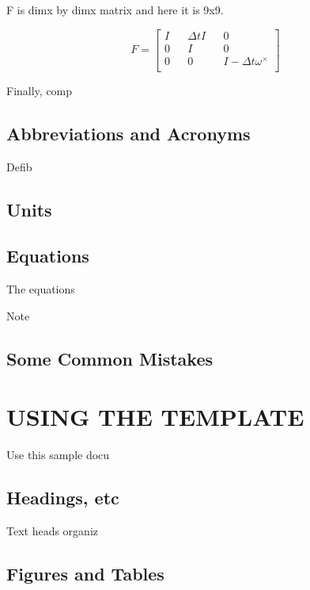 \documentclass[letterpaper, 10 pt, conference]{ieeeconf}  %
\begin{document}
F is dimx by dimx matrix and here it is 9x9.

\begin{equation}
F =
\begin{bmatrix}
        I && \Delta t   I && 0  \\
        0 && I && 0  \\
        0 && 0 && I- \Delta t \omega^{\times}  \\
\end{bmatrix}
\end{equation}




Finally, comp

\subsection{Abbreviations and Acronyms}
Defib

\subsection{Units}



\subsection{Equations}

The equations



Note

\subsection{Some Common Mistakes}

\section{USING THE TEMPLATE}

Use this sample docu

\subsection{Headings, etc}

Text heads organiz

\subsection{Figures and Tables}
\end{document}
